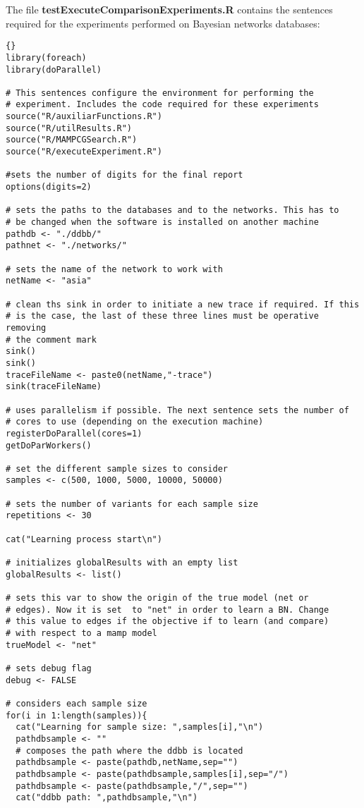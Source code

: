 \documentclass[11pt,professionalfont]{article}
\begin{document}
The file \textbf{testExecuteComparisonExperiments.R} contains the sentences required for the 
experiments performed on Bayesian networks databases:

\begin{small}
\lstset{linewidth=150mm}
\begin{lstlisting}[]{}
library(foreach)
library(doParallel)

# This sentences configure the environment for performing the
# experiment. Includes the code required for these experiments
source("R/auxiliarFunctions.R")
source("R/utilResults.R")
source("R/MAMPCGSearch.R")
source("R/executeExperiment.R")

#sets the number of digits for the final report
options(digits=2)

# sets the paths to the databases and to the networks. This has to
# be changed when the software is installed on another machine
pathdb <- "./ddbb/"
pathnet <- "./networks/"

# sets the name of the network to work with
netName <- "asia"

# clean ths sink in order to initiate a new trace if required. If this
# is the case, the last of these three lines must be operative removing
# the comment mark
sink()
sink()
traceFileName <- paste0(netName,"-trace")
sink(traceFileName)

# uses parallelism if possible. The next sentence sets the number of
# cores to use (depending on the execution machine)
registerDoParallel(cores=1)
getDoParWorkers()

# set the different sample sizes to consider
samples <- c(500, 1000, 5000, 10000, 50000)

# sets the number of variants for each sample size
repetitions <- 30

cat("Learning process start\n")

# initializes globalResults with an empty list
globalResults <- list()

# sets this var to show the origin of the true model (net or
# edges). Now it is set  to "net" in order to learn a BN. Change
# this value to edges if the objective if to learn (and compare)
# with respect to a mamp model
trueModel <- "net"

# sets debug flag
debug <- FALSE

# considers each sample size
for(i in 1:length(samples)){
  cat("Learning for sample size: ",samples[i],"\n")
  pathdbsample <- ""
  # composes the path where the ddbb is located
  pathdbsample <- paste(pathdb,netName,sep="")
  pathdbsample <- paste(pathdbsample,samples[i],sep="/")
  pathdbsample <- paste(pathdbsample,"/",sep="")
  cat("ddbb path: ",pathdbsample,"\n")
  

\end{lstlisting}
\end{small}
\end{document}

